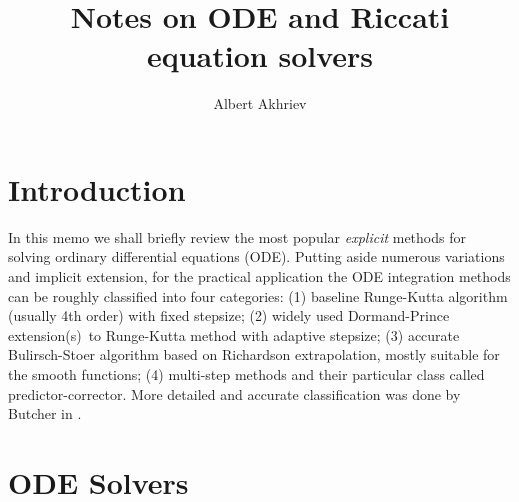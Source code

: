 \documentclass[]{article}
\title{Notes on ODE and Riccati equation solvers}
\author{Albert Akhriev}
\begin{document}
\maketitle
\tableofcontents


\section{Introduction}
In this memo we shall briefly review the most popular \textit{explicit} methods for solving ordinary differential equations (ODE). Putting aside numerous variations and implicit extension, for the practical application the ODE integration methods can be roughly classified into four categories: (1) baseline Runge-Kutta algorithm (usually 4th order) with fixed stepsize; (2) widely used Dormand-Prince extension(s) to Runge-Kutta method with adaptive stepsize; (3) accurate Bulirsch-Stoer algorithm based on Richardson extrapolation, mostly suitable for the smooth functions; (4) multi-step methods and their particular class called predictor-corrector. More detailed and accurate classification was done by Butcher in \cite{Butcher00}.

\section{ODE Solvers}
\end{document}
